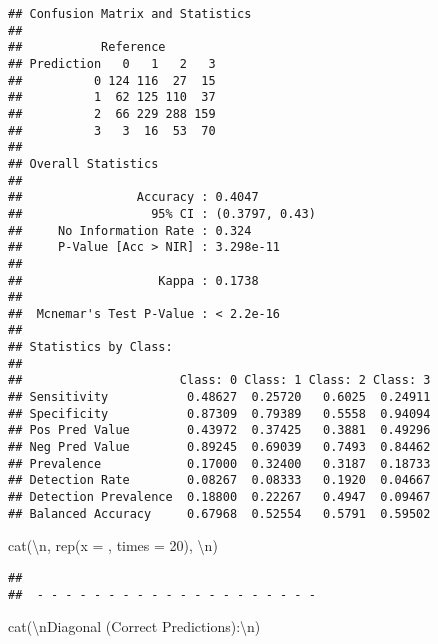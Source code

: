 \documentclass[
]{article}
\newenvironment{Shaded}{\begin{snugshade}}{\end{snugshade}}
\newcommand{\AttributeTok}[1]{\textcolor[rgb]{0.77,0.63,0.00}{#1}}
\newcommand{\DecValTok}[1]{\textcolor[rgb]{0.00,0.00,0.81}{#1}}
\newcommand{\FunctionTok}[1]{\textcolor[rgb]{0.00,0.00,0.00}{#1}}
\newcommand{\NormalTok}[1]{#1}
\newcommand{\SpecialCharTok}[1]{\textcolor[rgb]{0.00,0.00,0.00}{#1}}
\newcommand{\StringTok}[1]{\textcolor[rgb]{0.31,0.60,0.02}{#1}}
\begin{document}
\begin{verbatim}
## Confusion Matrix and Statistics
## 
##           Reference
## Prediction   0   1   2   3
##          0 124 116  27  15
##          1  62 125 110  37
##          2  66 229 288 159
##          3   3  16  53  70
## 
## Overall Statistics
##                                         
##                Accuracy : 0.4047        
##                  95% CI : (0.3797, 0.43)
##     No Information Rate : 0.324         
##     P-Value [Acc > NIR] : 3.298e-11     
##                                         
##                   Kappa : 0.1738        
##                                         
##  Mcnemar's Test P-Value : < 2.2e-16     
## 
## Statistics by Class:
## 
##                      Class: 0 Class: 1 Class: 2 Class: 3
## Sensitivity           0.48627  0.25720   0.6025  0.24911
## Specificity           0.87309  0.79389   0.5558  0.94094
## Pos Pred Value        0.43972  0.37425   0.3881  0.49296
## Neg Pred Value        0.89245  0.69039   0.7493  0.84462
## Prevalence            0.17000  0.32400   0.3187  0.18733
## Detection Rate        0.08267  0.08333   0.1920  0.04667
## Detection Prevalence  0.18800  0.22267   0.4947  0.09467
## Balanced Accuracy     0.67968  0.52554   0.5791  0.59502
\end{verbatim}

\begin{Shaded}
\begin{Highlighting}[]
\FunctionTok{cat}\NormalTok{(}\StringTok{\textquotesingle{}}\SpecialCharTok{\textbackslash{}n}\StringTok{\textquotesingle{}}\NormalTok{, }\FunctionTok{rep}\NormalTok{(}\AttributeTok{x =} \StringTok{\textquotesingle{}{-}\textquotesingle{}}\NormalTok{, }\AttributeTok{times =} \DecValTok{20}\NormalTok{), }\StringTok{\textquotesingle{}}\SpecialCharTok{\textbackslash{}n}\StringTok{\textquotesingle{}}\NormalTok{)}
\end{Highlighting}
\end{Shaded}

\begin{verbatim}
## 
##  - - - - - - - - - - - - - - - - - - - -
\end{verbatim}

\begin{Shaded}
\begin{Highlighting}[]
\FunctionTok{cat}\NormalTok{(}\StringTok{\textquotesingle{}}\SpecialCharTok{\textbackslash{}n}\StringTok{Diagonal (Correct Predictions):}\SpecialCharTok{\textbackslash{}n}\StringTok{\textquotesingle{}}\NormalTok{)}
\end{Highlighting}
\end{Shaded}
\end{document}
